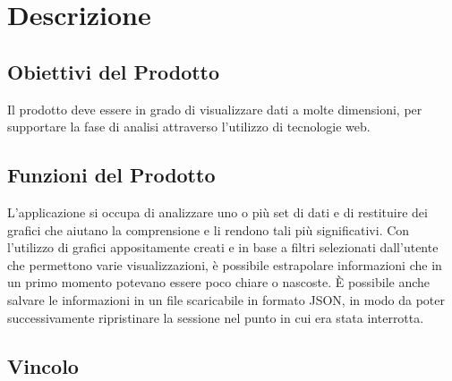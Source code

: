 \chapter{Descrizione}

\section{Obiettivi del Prodotto}
Il prodotto deve essere in grado di visualizzare dati a molte dimensioni, per supportare la fase di analisi attraverso l'utilizzo di tecnologie web.

\section{Funzioni del Prodotto}
L'applicazione si occupa di analizzare uno o più set di dati e di restituire dei grafici che aiutano la comprensione e li rendono tali più significativi.
Con l'utilizzo di grafici appositamente creati e in base a filtri selezionati dall'utente che permettono varie visualizzazioni, è possibile estrapolare informazioni che in un primo momento potevano essere poco chiare o nascoste.
È possibile anche salvare le informazioni in un file scaricabile in formato JSON, in modo da poter successivamente ripristinare la sessione nel punto in cui era stata interrotta.

\section{Vincolo}

